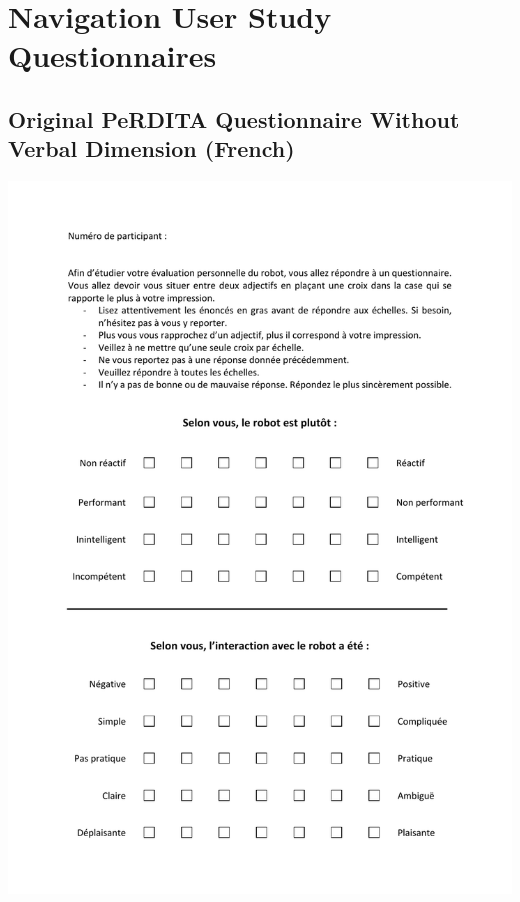 \chapter{Navigation User Study Questionnaires}
\label{annex:questionnaires}
\section{Original PeRDITA Questionnaire Without Verbal Dimension (French)}
\begin{center}
\includegraphics[page=1, width=\textwidth]{Annexes/PeRDITA_vParticipant_sansDimVerbale.pdf} 
\end{center}

